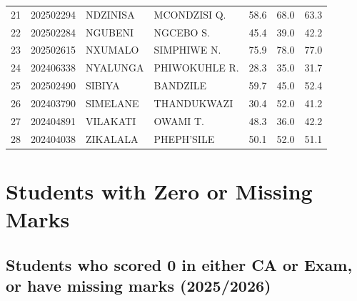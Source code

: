 \documentclass[12pt]{article}
\begin{document}
\begin{longtable}{@{}lllllll@{}}
21 & 202502294 & NDZINISA & MCONDZISI Q. & 58.6 & 68.0 & 63.3 \\
22 & 202502284 & NGUBENI & NGCEBO S. & 45.4 & 39.0 & 42.2 \\
23 & 202502615 & NXUMALO & SIMPHIWE N. & 75.9 & 78.0 & 77.0 \\
24 & 202406338 & NYALUNGA & PHIWOKUHLE R. & 28.3 & 35.0 & 31.7 \\
25 & 202502490 & SIBIYA & BANDZILE & 59.7 & 45.0 & 52.4 \\
26 & 202403790 & SIMELANE & THANDUKWAZI & 30.4 & 52.0 & 41.2 \\
27 & 202404891 & VILAKATI & OWAMI T. & 48.3 & 36.0 & 42.2 \\
28 & 202404038 & ZIKALALA & PHEPH'SILE & 50.1 & 52.0 & 51.1 \\

\end{longtable}

\clearpage

\section*{Students with Zero or Missing Marks}
\subsection*{Students who scored 0 in either CA or Exam, or have missing marks (2025/2026)}
\end{document}
